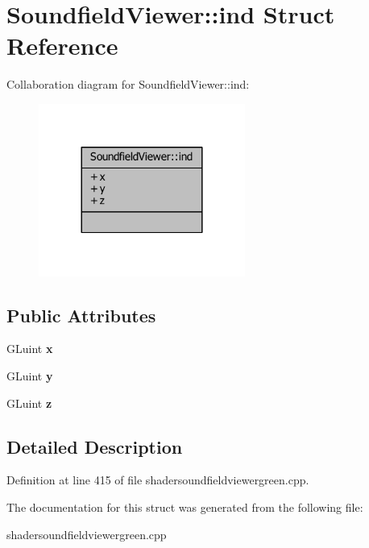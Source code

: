 \section{Soundfield\-Viewer\-:\-:ind Struct Reference}
\label{structSoundfieldViewer_1_1ind}


Collaboration diagram for Soundfield\-Viewer\-:\-:ind\-:\nopagebreak
\begin{figure}[H]
\begin{center}
\leavevmode
\includegraphics[width=192pt]{d5/dfc/structSoundfieldViewer_1_1ind__coll__graph}
\end{center}
\end{figure}
\subsection*{Public Attributes}
\begin{DoxyCompactItemize}
\item 
G\-Luint {\bfseries x}\label{structSoundfieldViewer_1_1ind_a927294557e04a7f419346305c3315b05}

\item 
G\-Luint {\bfseries y}\label{structSoundfieldViewer_1_1ind_a420c1072fd7f1dd65eea0a0af5e685a2}

\item 
G\-Luint {\bfseries z}\label{structSoundfieldViewer_1_1ind_a8b4ab441953cefe9deb5d17f91d25b25}

\end{DoxyCompactItemize}


\subsection{Detailed Description}


Definition at line 415 of file shadersoundfieldviewergreen.\-cpp.



The documentation for this struct was generated from the following file\-:\begin{DoxyCompactItemize}
\item 
shadersoundfieldviewergreen.\-cpp\end{DoxyCompactItemize}
